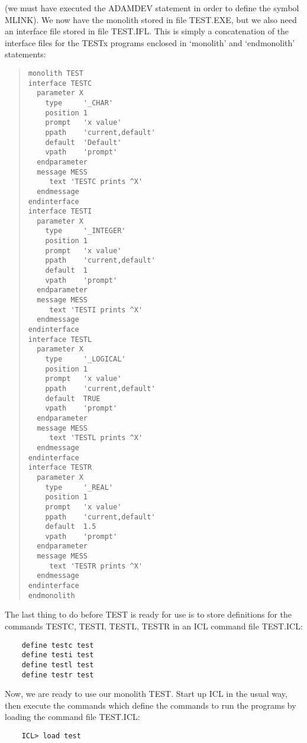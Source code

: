 (we must have executed the ADAMDEV statement in order to define the symbol
MLINK).
We now have the monolith stored in file TEST.EXE, but we also need an
interface file stored in file TEST.IFL.
This is simply a concatenation of the interface files for the TESTx programs
enclosed in `monolith' and `endmonolith' statements:
\begin{quote}

\begin{small}
\begin{verbatim}
monolith TEST
interface TESTC
  parameter X
    type     '_CHAR'
    position 1
    prompt   'x value'
    ppath    'current,default'
    default  'Default'
    vpath    'prompt'
  endparameter
  message MESS
     text 'TESTC prints ^X'
  endmessage
endinterface
interface TESTI
  parameter X
    type     '_INTEGER'
    position 1
    prompt   'x value'
    ppath    'current,default'
    default  1
    vpath    'prompt'
  endparameter
  message MESS
     text 'TESTI prints ^X'
  endmessage
endinterface
interface TESTL
  parameter X
    type     '_LOGICAL'
    position 1
    prompt   'x value'
    ppath    'current,default'
    default  TRUE
    vpath    'prompt'
  endparameter
  message MESS
     text 'TESTL prints ^X'
  endmessage
endinterface
interface TESTR
  parameter X
    type     '_REAL'
    position 1
    prompt   'x value'
    ppath    'current,default'
    default  1.5
    vpath    'prompt'
  endparameter
  message MESS
     text 'TESTR prints ^X'
  endmessage
endinterface
endmonolith
\end{verbatim}
\end{small}

\end{quote}
The last thing to do before TEST is ready for use is to store definitions for
the commands TESTC, TESTI, TESTL, TESTR in an ICL command file TEST.ICL:

\begin{small}
\begin{verbatim}
    define testc test
    define testi test
    define testl test
    define testr test
\end{verbatim}
\end{small}

Now, we are ready to use our monolith TEST.
Start up ICL in the usual way, then execute the commands which define the
commands to run the programs by loading the command file TEST.ICL:

\begin{small}
\begin{verbatim}
    ICL> load test
\end{verbatim}
\end{small}

